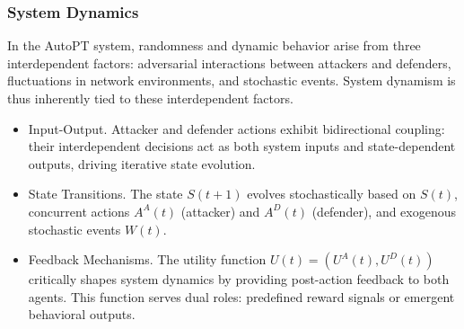 \subsubsection{System Dynamics}

In the AutoPT system, randomness and dynamic behavior arise from three interdependent factors: adversarial interactions between attackers and defenders, fluctuations in network environments, and stochastic events. System dynamism is thus inherently tied to these interdependent factors.


\begin{itemize}
    \item Input-Output. Attacker and defender actions exhibit bidirectional coupling: their interdependent decisions act as both system inputs and state-dependent outputs, driving iterative state evolution.
    \item State Transitions. The state \( S(t+1)\) evolves stochastically based on \( S(t) \), concurrent actions \( A^A(t) \) (attacker) and \( A^D(t) \) (defender), and exogenous stochastic events $W(t)$.
    \item Feedback Mechanisms. The utility function \( U(t) = (U^A(t), U^D(t)) \) critically shapes system dynamics by providing post-action feedback to both agents. This function serves dual roles: predefined reward signals or emergent behavioral outputs.
\end{itemize}



